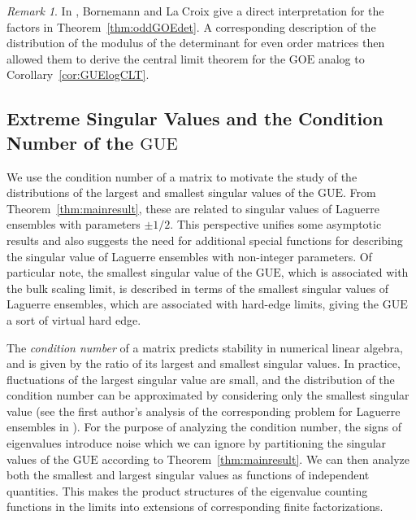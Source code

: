 \documentclass[pdftex, oneside, 10pt, letterpaper]{amsart}
\theoremstyle{plain}
\theoremstyle{definition}
\theoremstyle{remark}
\newtheorem*{rem}{Remark}
\begin{document}
\begin{rem}
  In \cite{Bornemann-LaCroix-GOE}, Bornemann and La$\;$Croix give a
  direct interpretation for the factors in
  Theorem~\ref{thm:oddGOEdet}.  A corresponding description of the
  distribution of the modulus of the determinant for even order
  matrices then allowed them to derive the central limit
  theorem for the {\ensuremath{\mathrm{GOE}}}{} analog to Corollary~\ref{cor:GUElogCLT}.
\end{rem}

\subsection{Extreme Singular Values and the Condition Number of the
  {\ensuremath{\mathrm{GUE}}}{}}\label{sec:extreme}

We use the condition number of a matrix to motivate the study of the
distributions of the largest and smallest singular values of the
{\ensuremath{\mathrm{GUE}}}{}.  From Theorem~\ref{thm:mainresult}, these are related to
singular values of Laguerre ensembles with parameters $\pm1/2$.  This
perspective unifies some 
asymptotic results and also
suggests the need for additional special functions for describing
the singular value of Laguerre ensembles with
non-integer parameters.  Of particular note, the smallest singular
value of the {\ensuremath{\mathrm{GUE}}}{}, which is associated with the bulk scaling limit,
is described in terms of the smallest singular values of Laguerre
ensembles, which are associated with hard-edge limits, giving the
{\ensuremath{\mathrm{GUE}}}{} a sort of virtual hard edge.

The \emph{condition number} of a matrix predicts stability in
numerical linear algebra, and is given by the ratio of its largest and
smallest singular values.  In practice, fluctuations of the largest
singular value are small, and the distribution of the condition number
can be approximated by considering only the smallest singular value
(see the first author's analysis of the corresponding problem for
Laguerre ensembles in \cite{Edelman-condition}).  For the purpose of
analyzing the condition number, the signs of eigenvalues introduce
noise which we can ignore by partitioning the singular values of the
{\ensuremath{\mathrm{GUE}}}{} according to Theorem~\ref{thm:mainresult}.  We can then analyze
both the smallest and largest singular values as functions of
independent quantities.  This makes the product structures of the
eigenvalue counting functions in the limits into extensions of
corresponding finite factorizations.
\end{document}
